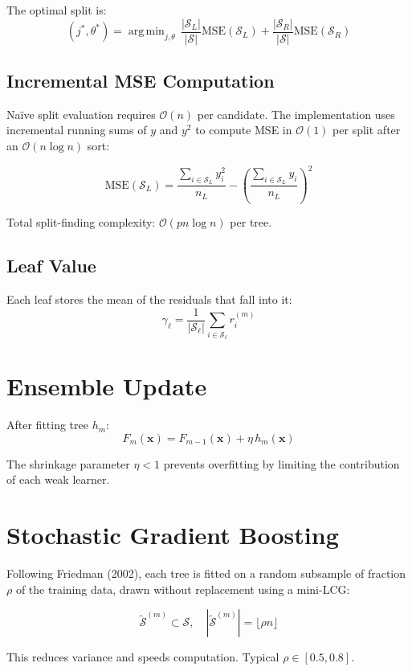 \documentclass[12pt,a4paper]{report}
\DeclareMathOperator*{\argmin}{arg\,min}
\newcommand{\vect}[1]{\bm{#1}}
\theoremstyle{definition}
\begin{document}
The optimal split is:
\[
  (j^*, \theta^*) = \argmin_{j, \theta}\,
    \frac{|\mathcal{S}_L|}{|\mathcal{S}|}\text{MSE}(\mathcal{S}_L)
    + \frac{|\mathcal{S}_R|}{|\mathcal{S}|}\text{MSE}(\mathcal{S}_R)
\]

\subsection{Incremental MSE Computation}

Naïve split evaluation requires $\mathcal{O}(n)$ per candidate. The implementation
uses incremental running sums of $y$ and $y^2$ to compute MSE in $\mathcal{O}(1)$
per split after an $\mathcal{O}(n \log n)$ sort:

\[
  \text{MSE}(\mathcal{S}_L) = \frac{\sum_{i \in \mathcal{S}_L} y_i^2}{n_L}
    - \left(\frac{\sum_{i \in \mathcal{S}_L} y_i}{n_L}\right)^2
\]

Total split-finding complexity: $\mathcal{O}(pn\log n)$ per tree.

\subsection{Leaf Value}

Each leaf stores the mean of the residuals that fall into it:
\[
  \gamma_{\ell} = \frac{1}{|\mathcal{S}_\ell|}\sum_{i \in \mathcal{S}_\ell} r_i^{(m)}
\]

\section{Ensemble Update}

After fitting tree $h_m$:
\[
  F_m(\vect{x}) = F_{m-1}(\vect{x}) + \eta\, h_m(\vect{x})
\]

The shrinkage parameter $\eta < 1$ prevents overfitting by limiting the
contribution of each weak learner.

\section{Stochastic Gradient Boosting}

Following Friedman (2002), each tree is fitted on a random subsample of fraction
$\rho$ of the training data, drawn without replacement using a mini-LCG:

\[
  \tilde{\mathcal{S}}^{(m)} \subset \mathcal{S}, \quad |\tilde{\mathcal{S}}^{(m)}| = \lfloor \rho n \rfloor
\]

This reduces variance and speeds computation. Typical $\rho \in [0.5, 0.8]$.
\end{document}
